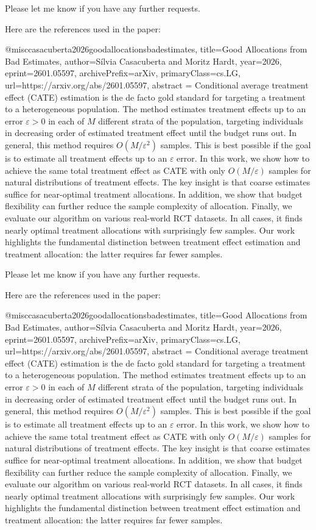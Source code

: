 Please let me know if you have any further requests. 

Here are the references used in the paper:

@misc{casacuberta2026goodallocationsbadestimates,
      title={Good Allocations from Bad Estimates}, 
      author={Sílvia Casacuberta and Moritz Hardt},
      year={2026},
      eprint={2601.05597},
      archivePrefix={arXiv},
      primaryClass={cs.LG},
      url={https://arxiv.org/abs/2601.05597},
      abstract = {Conditional average treatment effect (CATE) estimation is the de facto gold standard for targeting a treatment to a heterogeneous population. The method estimates treatment effects up to an error $ε> 0$ in each of $M$ different strata of the population, targeting individuals in decreasing order of estimated treatment effect until the budget runs out. In general, this method requires $O(M/ε^2)$ samples. This is best possible if the goal is to estimate all treatment effects up to an $ε$ error. In this work, we show how to achieve the same total treatment effect as CATE with only $O(M/ε)$ samples for natural distributions of treatment effects. The key insight is that coarse estimates suffice for near-optimal treatment allocations. In addition, we show that budget flexibility can further reduce the sample complexity of allocation. Finally, we evaluate our algorithm on various real-world RCT datasets. In all cases, it finds nearly optimal treatment allocations with surprisingly few samples. Our work highlights the fundamental distinction between treatment effect estimation and treatment allocation: the latter requires far fewer samples.}
} 

Please let me know if you have any further requests. 

Here are the references used in the paper:

@misc{casacuberta2026goodallocationsbadestimates,
      title={Good Allocations from Bad Estimates}, 
      author={Sílvia Casacuberta and Moritz Hardt},
      year={2026},
      eprint={2601.05597},
      archivePrefix={arXiv},
      primaryClass={cs.LG},
      url={https://arxiv.org/abs/2601.05597},
      abstract = {Conditional average treatment effect (CATE) estimation is the de facto gold standard for targeting a treatment to a heterogeneous population. The method estimates treatment effects up to an error $ε> 0$ in each of $M$ different strata of the population, targeting individuals in decreasing order of estimated treatment effect until the budget runs out. In general, this method requires $O(M/ε^2)$ samples. This is best possible if the goal is to estimate all treatment effects up to an $ε$ error. In this work, we show how to achieve the same total treatment effect as CATE with only $O(M/ε)$ samples for natural distributions of treatment effects. The key insight is that coarse estimates suffice for near-optimal treatment allocations. In addition, we show that budget flexibility can further reduce the sample complexity of allocation. Finally, we evaluate our algorithm on various real-world RCT datasets. In all cases, it finds nearly optimal treatment allocations with surprisingly few samples. Our work highlights the fundamental distinction between treatment effect estimation and treatment allocation: the latter requires far fewer samples.}
} 

